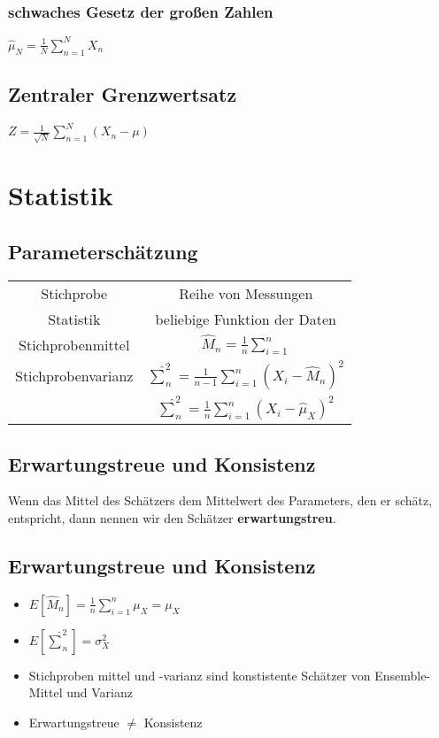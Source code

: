 \documentclass{article}
\begin{document}
\subsubsection{schwaches Gesetz der gro\ss en Zahlen}
$\hat{\mu}_N = \frac{1}{N} \sum_{n = 1}^N X_n$
\subsection{Zentraler Grenzwertsatz}
$Z = \frac{1}{\sqrt{N}}\sum_{n = 1}^N(X_n -\mu)$

\section {Statistik}
\subsection{Parameterschätzung}
\begin{tabular}{c c }
Stichprobe& Reihe von Messungen \\
Statistik & beliebige Funktion der Daten \\
Stichprobenmittel & $\hat{M}_n = \frac{1}{n} \sum_{i=1}^n$\\
Stichprobenvarianz & $\hat{\sum}_n^2 = \frac{1}{n-1} \sum_{i = 1}^n(X_i-\hat{M}_n)^2$ \\
		& $\hat{\sum}_n^2 = \frac{1}{n} \sum_{i = 1}^n(X_i-\hat{\mu}_X)^2$
\end{tabular}
\subsection{Erwartungstreue und Konsistenz}
Wenn das Mittel des Schätzers dem Mittelwert des Parameters, den er schätz, entspricht, dann nennen wir den Schätzer \textbf{ erwartungstreu}.



\subsection{Erwartungstreue und Konsistenz}
\begin{itemize}
\item $ E[\hat{M}_n] = \frac{1}{n} \sum_{i=1}^n \mu_X = \mu_X$
\item $E[\hat{\sum}_n^2] = \sigma_X^2$
\item Stichproben mittel und -varianz sind konstistente Schätzer von Ensemble-Mittel und Varianz
\item Erwartungstreue $\neq$ Konsistenz
\end{itemize}
\end{document}
